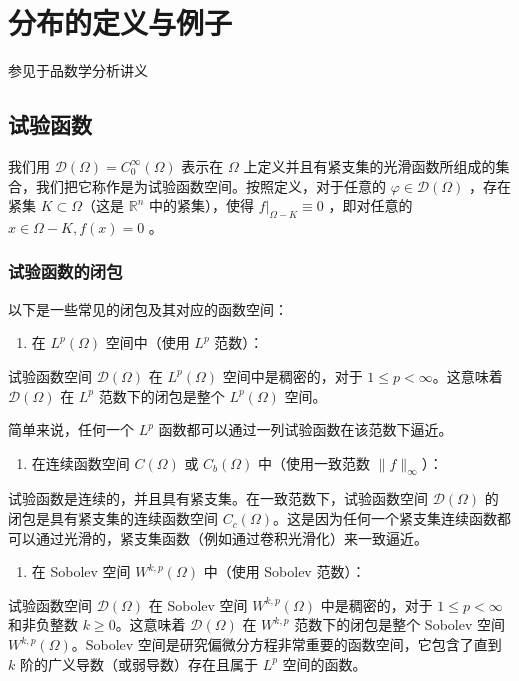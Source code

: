 \section{分布的定义与例子}

参见于品数学分析讲义

\subsection{试验函数}

我们用 $\mathcal{D}(\Omega)=C_0^{\infty}(\Omega)$ 表示在 $\Omega$ 上定义并且有紧支集的光滑函数所组成的集合，我们把它称作是为试验函数空间。按照定义，对于任意的 $\varphi \in \mathcal{D}(\Omega)$ ，存在紧集 $K \subset \Omega$（这是 $\mathbb{R}^n$ 中的紧集），使得 $\left.f\right|_{\Omega-K} \equiv 0$ ，即对任意的 $x \in \Omega-K, f(x)=0$ 。

\subsubsection{试验函数的闭包}

以下是一些常见的闭包及其对应的函数空间：

\begin{enumerate}
	\item 在 $L^p(\Omega)$ 空间中（使用 $L^p$ 范数）：
\end{enumerate}

试验函数空间 $\mathcal{D}(\Omega)$ 在 $L^p(\Omega)$ 空间中是稠密的，对于 $1 \leq p<\infty$。这意味着 $\mathcal{D}(\Omega)$ 在 $L^p$ 范数下的闭包是整个 $L^p(\Omega)$ 空间。

简单来说，任何一个 $L^p$ 函数都可以通过一列试验函数在该范数下逼近。

\begin{enumerate}
	\item 在连续函数空间 $C(\Omega)$ 或 $C_b(\Omega)$ 中（使用一致范数 $\|f\|_{\infty}$）：
\end{enumerate}

试验函数是连续的，并且具有紧支集。在一致范数下，试验函数空间 $\mathcal{D}(\Omega)$ 的闭包是具有紧支集的连续函数空间 $C_c(\Omega)$。这是因为任何一个紧支集连续函数都可以通过光滑的，紧支集函数（例如通过卷积光滑化）来一致逼近。

\begin{enumerate}
	\item 在 Sobolev 空间 $W^{k, p}(\Omega)$ 中（使用 Sobolev 范数）：
\end{enumerate}

试验函数空间 $\mathcal{D}(\Omega)$ 在 Sobolev 空间 $W^{k, p}(\Omega)$ 中是稠密的，对于 $1 \leq p<\infty$ 和非负整数 $k \geq 0$。这意味着 $\mathcal{D}(\Omega)$ 在 $W^{k, p}$ 范数下的闭包是整个 Sobolev 空间 $W^{k, p}(\Omega)$。Sobolev 空间是研究偏微分方程非常重要的函数空间，它包含了直到 $k$ 阶的广义导数（或弱导数）存在且属于 $L^p$ 空间的函数。

